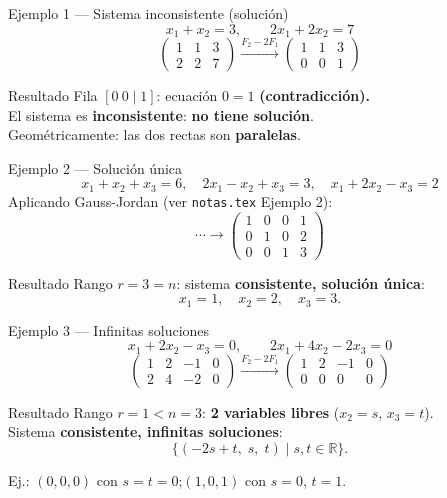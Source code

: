 \documentclass[11pt]{beamer}
\begin{document}
\begin{frame}{Ejemplo 1 — Sistema inconsistente (solución)}
  \[
    x_1+x_2=3, \qquad 2x_1+2x_2=7
  \]
  \[
    \left(\begin{array}{cc|c}1&1&3\\2&2&7\end{array}\right)
    \xrightarrow{F_2-2F_1}
    \left(\begin{array}{cc|c}1&1&3\\0&0&1\end{array}\right)
  \]
  \begin{alertblock}{Resultado}
    Fila $[0\ 0\mid 1]$: ecuación $0=1$ \textbf{(contradicción).}\\
    El sistema es \textbf{inconsistente}: \textbf{no tiene solución}.\\
    Geométricamente: las dos rectas son \textbf{paralelas}.
  \end{alertblock}
\end{frame}

\begin{frame}{Ejemplo 2 — Solución única}
  \[
    x_1+x_2+x_3=6,\quad 2x_1-x_2+x_3=3,\quad x_1+2x_2-x_3=2
  \]
  Aplicando Gauss-Jordan (ver \texttt{notas.tex} Ejemplo 2):
  \[
    \cdots\longrightarrow
    \left(\begin{array}{ccc|c}1&0&0&1\\0&1&0&2\\0&0&1&3\end{array}\right)
  \]
  \begin{block}{Resultado}
    Rango $r=3=n$: sistema \textbf{consistente, solución única}:
    \[
      x_1=1,\quad x_2=2,\quad x_3=3.
    \]
  \end{block}
\end{frame}

\begin{frame}{Ejemplo 3 — Infinitas soluciones}
  \[
    x_1+2x_2-x_3=0, \qquad 2x_1+4x_2-2x_3=0
  \]
  \[
    \left(\begin{array}{ccc|c}1&2&-1&0\\2&4&-2&0\end{array}\right)
    \xrightarrow{F_2-2F_1}
    \left(\begin{array}{ccc|c}1&2&-1&0\\0&0&0&0\end{array}\right)
  \]
  \begin{block}{Resultado}
    Rango $r=1<n=3$: \textbf{2 variables libres} ($x_2=s$, $x_3=t$).\\
    Sistema \textbf{consistente, infinitas soluciones}:
    \[
      \{(-2s+t,\;s,\;t)\mid s,t\in\mathbb{R}\}.
    \]
  \end{block}
  \small Ej.: $(0,0,0)$ con $s=t=0$;\quad $(1,0,1)$ con $s=0,\,t=1$.
\end{frame}
\end{document}
